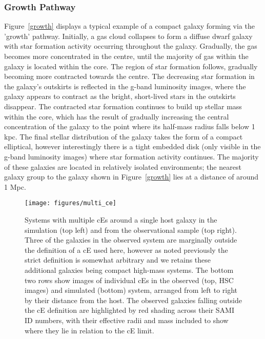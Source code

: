 \documentclass[a4paper,fleqn,usenatbib]{mnras}
\begin{document}
\subsubsection{Growth Pathway}

Figure~\ref{growth} displays a typical example of a compact galaxy forming via the 'growth' pathway. Initially, a gas cloud collapses to form a diffuse dwarf galaxy with star formation activity occurring throughout the galaxy. Gradually, the gas becomes more concentrated in the centre, until the majority of gas within the galaxy is located within the core. The region of star formation follows, gradually becoming more contracted towards the centre. The decreasing star formation in the galaxy's outskirts is reflected in the g-band luminosity images, where the galaxy appears to contract as the bright, short-lived stars in the outskirts disappear. The contracted star formation continues to build up stellar mass within the core, which has the result of gradually increasing the central concentration of the galaxy to the point where its half-mass radius falls below 1 kpc. The final stellar distribution of the galaxy takes the form of a compact elliptical, however interestingly there is a tight embedded disk (only visible in the g-band luminosity images) where star formation activity continues. The majority of these galaxies are located in relatively isolated environments; the nearest galaxy group to the galaxy shown in Figure~\ref{growth}  lies at a distance of around 1 Mpc. 




\begin{figure*}
\texttt{[image: figures/multi\_ce]}
   \caption{Systems with multiple cEs around a single host galaxy in the simulation (top left) and from the observational sample (top right). Three of the galaxies in the observed system are marginally outside the definition of a cE used here, however as noted previously the strict definition is somewhat arbitrary and we retains these additional galaxies being compact high-mass systems. The bottom two rows show images of individual cEs in the observed (top, HSC images) and simulated (bottom) system, arranged from left to right by their distance from the host. The observed galaxies falling outside the cE definition are highlighted by red shading across their SAMI ID numbers, with their effective radii and mass included to show where they lie in relation to the cE limit. }
 \label{multi_ce}
 \end{figure*}
\end{document}
